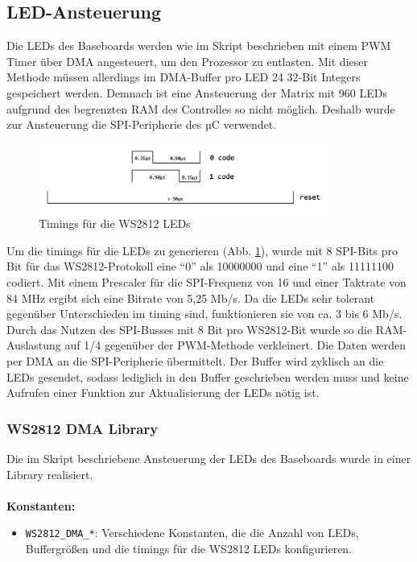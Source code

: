 \subsection{LED-Ansteuerung} \label{LED-Ansteuerung}
Die LEDs des Baseboards werden wie im Skript beschrieben mit einem PWM Timer über DMA angesteuert, um den Prozessor zu entlasten. Mit dieser Methode müssen allerdings im DMA-Buffer pro LED 24 32-Bit Integers gespeichert werden. Demnach ist eine Ansteuerung der Matrix mit 960 LEDs aufgrund des begrenzten RAM des Controlles so nicht möglich. Deshalb wurde zur Ansteuerung die SPI-Peripherie des µC verwendet. 
\begin{figure}[H]
    \centering
    \includegraphics[page=1,width=0.85\textwidth]{images/ws2812b-timings.png} 
    \caption{Timings für die WS2812 LEDs \cite{ws2812_SPI}}
    \label{fig:ws2812b-timings}
\end{figure}
\noindent Um die timings für die LEDs zu generieren (Abb. \ref{fig:ws2812b-timings}), wurde mit 8 SPI-Bits pro Bit für das WS2812-Protokoll eine “0” als 10000000 und eine “1” als 11111100 codiert. Mit einem Prescaler für die SPI-Frequenz von 16 und einer Taktrate von 84 MHz ergibt sich eine Bitrate von 5,25 Mb/s. Da die LEDs sehr tolerant gegenüber Unterschieden im timing sind, funktionieren sie von ca. 3 bis 6 Mb/s. Durch das Nutzen des SPI-Busses mit 8 Bit pro WS2812-Bit wurde so die RAM-Auslastung auf 1/4 gegenüber der PWM-Methode verkleinert. Die Daten werden per DMA an die SPI-Peripherie übermittelt. Der Buffer wird zyklisch an die LEDs gesendet, sodass lediglich in den Buffer geschrieben werden muss und keine Aufrufen einer Funktion zur Aktualisierung der LEDs nötig ist.

\subsubsection{WS2812 DMA Library}
Die im Skript beschriebene Ansteuerung der LEDs des Baseboards wurde in einer Library realisiert. \\\\
\noindent \textbf{Konstanten:}
{\renewcommand\labelitemi{}
\begin{itemize}[leftmargin=*]
    \item \texttt{WS2812\_DMA\_*}: Verschiedene Konstanten, die die Anzahl von LEDs, Buffergrößen und die timings für die WS2812 LEDs konfigurieren.
\end{itemize}
}

